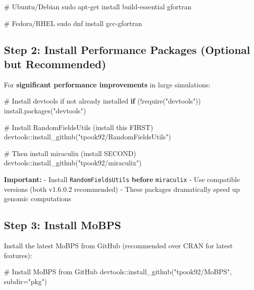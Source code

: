 \documentclass[
  letterpaper,
]{book}
\newenvironment{Shaded}{\begin{snugshade}}{\end{snugshade}}
\newcommand{\AttributeTok}[1]{\textcolor[rgb]{0.40,0.45,0.13}{#1}}
\newcommand{\CommentTok}[1]{\textcolor[rgb]{0.37,0.37,0.37}{#1}}
\newcommand{\ControlFlowTok}[1]{\textcolor[rgb]{0.00,0.23,0.31}{\textbf{#1}}}
\newcommand{\FunctionTok}[1]{\textcolor[rgb]{0.28,0.35,0.67}{#1}}
\newcommand{\NormalTok}[1]{\textcolor[rgb]{0.00,0.23,0.31}{#1}}
\newcommand{\SpecialCharTok}[1]{\textcolor[rgb]{0.37,0.37,0.37}{#1}}
\newcommand{\StringTok}[1]{\textcolor[rgb]{0.13,0.47,0.30}{#1}}
\begin{document}
\begin{Shaded}
\begin{Highlighting}[]
\CommentTok{\# Ubuntu/Debian}
\FunctionTok{sudo}\NormalTok{ apt{-}get install build{-}essential gfortran}

\CommentTok{\# Fedora/RHEL}
\FunctionTok{sudo}\NormalTok{ dnf install gcc{-}gfortran}
\end{Highlighting}
\end{Shaded}

\subsection{Step 2: Install Performance Packages (Optional but
Recommended)}\label{step-2-install-performance-packages-optional-but-recommended}

For \textbf{significant performance improvements} in large simulations:

\begin{Shaded}
\begin{Highlighting}[]
\CommentTok{\# Install devtools if not already installed}
\ControlFlowTok{if}\NormalTok{ (}\SpecialCharTok{!}\FunctionTok{require}\NormalTok{(}\StringTok{"devtools"}\NormalTok{)) }\FunctionTok{install.packages}\NormalTok{(}\StringTok{"devtools"}\NormalTok{)}

\CommentTok{\# Install RandomFieldsUtils (install this FIRST)}
\NormalTok{devtools}\SpecialCharTok{::}\FunctionTok{install\_github}\NormalTok{(}\StringTok{"tpook92/RandomFieldsUtils"}\NormalTok{)}

\CommentTok{\# Then install miraculix (install SECOND)}
\NormalTok{devtools}\SpecialCharTok{::}\FunctionTok{install\_github}\NormalTok{(}\StringTok{"tpook92/miraculix"}\NormalTok{)}
\end{Highlighting}
\end{Shaded}

\textbf{Important:} - Install \texttt{RandomFieldsUtils} \textbf{before}
\texttt{miraculix} - Use compatible versions (both v1.6.0.2 recommended)
- These packages dramatically speed up genomic computations

\subsection{Step 3: Install MoBPS}\label{step-3-install-mobps}

Install the latest MoBPS from GitHub (recommended over CRAN for latest
features):

\begin{Shaded}
\begin{Highlighting}[]
\CommentTok{\# Install MoBPS from GitHub}
\NormalTok{devtools}\SpecialCharTok{::}\FunctionTok{install\_github}\NormalTok{(}\StringTok{"tpook92/MoBPS"}\NormalTok{, }\AttributeTok{subdir=}\StringTok{"pkg"}\NormalTok{)}
\end{Highlighting}
\end{Shaded}
\end{document}
